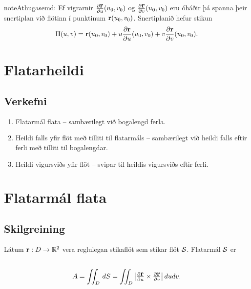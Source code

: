 \documentclass[a4paper,10pt,icelandic]{sphinxmanual}
\begin{document}
\begin{notice}{note}{Athugasemd:}
Ef vigrarnir \(\frac{\partial \mbox{${\bf r}$}}{\partial u}(u_0,v_0)\) og \(\frac{\partial\mbox{${\bf r}$}}{\partial v}(u_0,v_0)\) eru óháðir þá spanna þeir snertiplan við flötinn í punktinum \(\mbox{${\bf r}$}(u_0,v_0)\). Snertiplanið hefur stikun
\begin{gather}
\begin{split}\displaystyle
\Pi(u,v) = \mbox{${\bf r}$}(u_0,v_0)+u\frac{\partial \mbox{${\bf r}$}}{\partial u}(u_0,v_0)+v\frac{\partial \mbox{${\bf r}$}}{\partial v}(u_0,v_0).\end{split}\notag
\end{gather}\end{notice}


\section{Flatarheildi}
\label{Kafli5:index-7}\label{Kafli5:flatarheildi}

\subsection{Verkefni}
\label{Kafli5:verkefni}\begin{enumerate}
\item {} 
Flatarmál flata – sambærilegt við bogalengd ferla.

\item {} 
Heildi falls yfir flöt með tilliti til flatarmáls – sambærilegt við
heildi falls eftir ferli með tilliti til bogalengdar.

\item {} 
Heildi vigursviðs yfir flöt – svipar til heildis vigursviðs eftir
ferli.

\end{enumerate}


\section{Flatarmál flata}
\label{Kafli5:flatarmal-flata}

\subsection{Skilgreining}
\label{Kafli5:id19}
Látum \(\mbox{${\bf r}$}:D\rightarrow {\mathbb  R}^2\) vera
reglulegan stikaflöt sem stikar flöt \(\cal S\). Flatarmál
\(\cal S\) er
\begin{gather}
\begin{split}\displaystyle\end{split}\notag\\\begin{split}A=\int\!\!\!\int_D\,dS=\int\!\!\!\int_D \big|{\textstyle\frac{\partial \mbox{${\bf r}$}}{\partial u}
\times\frac{\partial \mbox{${\bf r}$}}{\partial v}}\big|\,dudv.\end{split}\notag
\end{gather}
\end{document}
